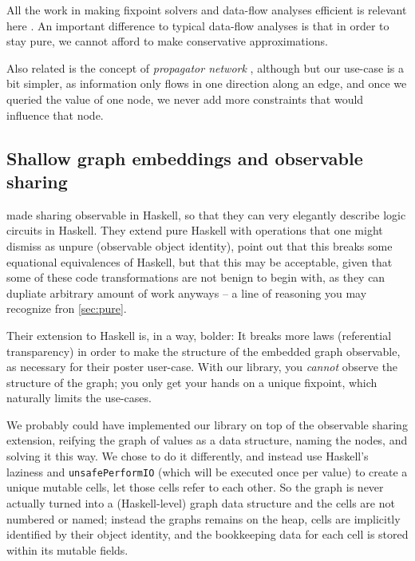 \documentclass[manuscript,screen,acmsmall]{acmart}
\begin{document}
All the work in making fixpoint solvers and data-flow analyses efficient is relevant here \citep{kildall-73,kam-ullman-76}. An important difference to typical data-flow analyses is that in order to stay pure, we cannot afford to make conservative approximations.

Also related is the concept of \emph{propagator network} \citep{propagator}, although but our use-case is a bit simpler, as information only flows in one direction along an edge, and once we queried the value of one node, we never add more constraints that would influence that node.

%

\subsection{Shallow graph embeddings and observable sharing}

 made sharing observable in Haskell, so that they can very elegantly describe logic circuits in Haskell. They extend pure Haskell with operations that one might dismiss as unpure (observable object identity), point out that this breaks some equational equivalences of Haskell, but that this may be acceptable, given that some of these code transformations are not benign to begin with, as they can dupliate arbitrary amount of work anyways -- a line of reasoning you may recognize fron \cref{sec:pure}.

Their extension to Haskell is, in a way, bolder: It breaks more laws (referential transparency) in order to make the structure of the embedded graph observable, as necessary for their poster user-case. With our library, you \emph{cannot} observe the structure of the graph; you only get your hands on a unique fixpoint, which naturally limits the use-cases.

We probably could have implemented our library on top of the observable sharing extension, reifying the graph of values as a data structure, naming the nodes, and solving it this way. We chose to do it differently, and instead use Haskell's laziness and \verb|unsafePerformIO| (which will be executed once per value) to create a unique mutable cells, let those cells refer to each other. So the graph is never actually turned into a (Haskell-level) graph data structure and the cells are not numbered or named; instead the graphs remains on the heap, cells are implicitly identified by their object identity, and the bookkeeping data for each cell is stored within its mutable fields.
\end{document}
